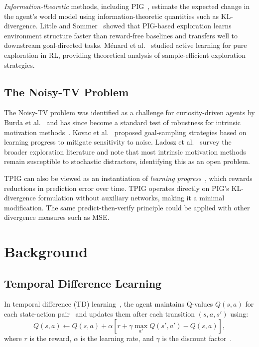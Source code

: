 \documentclass[letterpaper]{article} %
\begin{document}
\emph{Information-theoretic} methods, including PIG~\cite{10.3389/fncir.2013.00037},
estimate the expected change in the agent's world model using
information-theoretic quantities such as KL-divergence.  Little and
Sommer~ showed that PIG-based
exploration learns environment structure faster than reward-free
baselines and transfers well to downstream goal-directed tasks.
M\'{e}nard et al.~
studied active learning for pure exploration in RL, providing
theoretical analysis of sample-efficient exploration strategies.

\subsection{The Noisy-TV Problem}

The Noisy-TV problem was identified as a challenge for
curiosity-driven agents by Burda et
al.~ and has since become a standard test
of robustness for intrinsic motivation
methods~\cite{DBLP:journals/corr/abs-2008-04388}.  Kovac et
al.~ proposed
goal-sampling strategies based on learning progress to mitigate
sensitivity to noise.  Ladosz et
al.~ survey the broader exploration literature and
note that most intrinsic motivation methods remain susceptible to
stochastic distractors, identifying this as an open problem.

TPIG can also be viewed as an instantiation of \emph{learning
progress}~\cite{Oudeyer2007intrinsic}, which rewards reductions in
prediction error over time.  TPIG operates directly on PIG's
KL-divergence formulation without auxiliary networks, making it a
minimal modification.  The same predict-then-verify principle could
be applied with other divergence measures such as MSE.

\section{Background}

\subsection{Temporal Difference Learning}

In temporal difference (TD) learning~\cite{Sutton1998}, the agent
maintains Q-values $Q(s,a)$ for each state-action
pair~\cite{Watkins1992Qlearning} and updates them after each
transition $(s,a,s')$ using:
\begin{equation}
  Q(s,a) \leftarrow Q(s,a) + \alpha \left[r + \gamma \max_{a'} Q(s',a') - Q(s,a)\right],
  \label{eq:TDQVF}
\end{equation}
where $r$ is the reward, $\alpha$ is the learning rate, and $\gamma$
is the discount factor~\cite{Sutton1998}.
\end{document}
